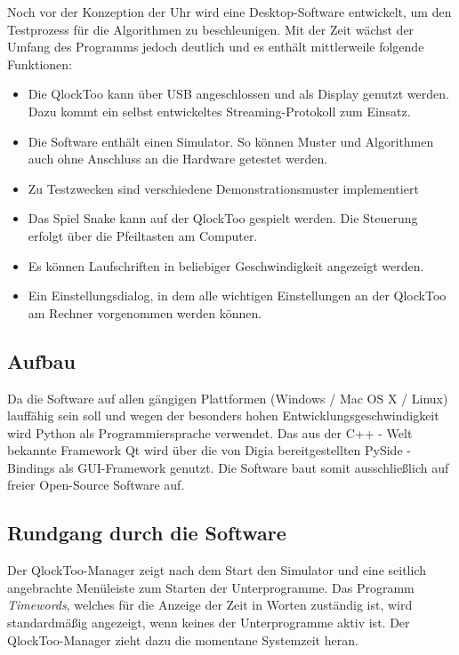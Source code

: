 \begin{multicols}{2}
Noch vor der Konzeption der Uhr wird eine Desktop-Software entwickelt, um den Testprozess für die Algorithmen zu beschleunigen. Mit der Zeit wächst der Umfang des Programms jedoch deutlich und es enthält mittlerweile folgende Funktionen:

\begin{itemize}
\item Die QlockToo kann über USB angeschlossen und als Display genutzt werden. Dazu kommt ein selbst entwickeltes Streaming-Protokoll zum Einsatz.
\item Die Software enthält einen Simulator. So können Muster und Algorithmen auch ohne Anschluss an die Hardware getestet werden.
\item Zu Testzwecken sind verschiedene Demonstrationsmuster implementiert
\item Das Spiel Snake kann auf der QlockToo gespielt werden. Die Steuerung erfolgt über die Pfeiltasten am Computer.
\item Es können Laufschriften in beliebiger Geschwindigkeit angezeigt werden.
\item Ein Einstellungsdialog, in dem alle wichtigen Einstellungen an der QlockToo am Rechner vorgenommen werden können.
\end{itemize}

\subsection{Aufbau}
Da die Software auf allen gängigen Plattformen (Windows / Mac OS X / Linux) lauffähig sein soll und wegen der besonders hohen Entwicklungsgeschwindigkeit wird Python als Programmiersprache verwendet.
Das aus der C++ - Welt bekannte Framework Qt wird über die von Digia bereitgestellten PySide -Bindings als GUI-Framework genutzt. Die Software baut somit ausschließlich auf freier Open-Source Software auf.

\subsection{Rundgang durch die Software}
Der QlockToo-Manager zeigt nach dem Start den Simulator und eine seitlich angebrachte Menüleiste zum Starten der Unterprogramme.
Das Programm \emph{Timewords}, welches für die Anzeige der Zeit in Worten zuständig ist, wird standardmäßig angezeigt, wenn keines der Unterprogramme aktiv ist. Der QlockToo-Manager zieht dazu die momentane Systemzeit heran.


\end{multicols}
